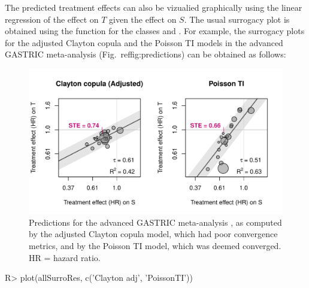 \documentclass[article,shortnames, nojss]{jss}\usepackage[]{graphicx}\usepackage[]{color}
\begin{document}
The predicted treatment effects can also be vizualied graphically
using the linear regression of the effect on $T$ given the effect on $S$.
The usual surrogacy plot is obtained using the function 
for the classes  and .
For example, the surrogacy plots
for the adjusted Clayton copula and the Poisson TI models
in the advanced GASTRIC meta-analysis (Fig.~ref{fig:predictions})
can be obtained as follows:
\begin{Schunk}
\begin{figure}
\includegraphics[width=\textwidth]{figure/predictions-1} \caption[Predictions for the advanced GASTRIC meta-analysis \citep{GASTRIC13}, as computed by the adjusted Clayton copula model, which had poor convergence metrics, and by the Poisson TI model, which was deemed converged]{Predictions for the advanced GASTRIC meta-analysis \citep{GASTRIC13}, as computed by the adjusted Clayton copula model, which had poor convergence metrics, and by the Poisson TI model, which was deemed converged. HR = hazard ratio.}\label{fig:predictions}
\end{figure}
\end{Schunk}
\begin{Schunk}
\begin{Sinput}
R>   plot(allSurroRes, c('Clayton adj', 'PoissonTI'))
\end{Sinput}
\end{Schunk}
\end{document}
